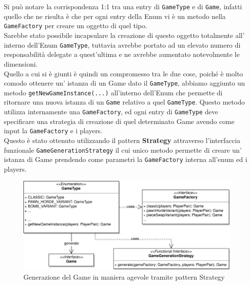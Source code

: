 \documentclass[a4paper,12pt]{report}
\begin{document}
\paragraph{}
\
\\
Si può notare la corrispondenza 1:1 tra una entry di \texttt{GameType} e di \texttt{Game}, infatti quello che ne risulta è che per ogni entry della Enum vi è un metodo nella \texttt{GameFactory} per creare un oggetto di quel tipo.
\\
Sarebbe stato possibile incapsulare la creazione di questo oggetto totalmente all' interno dell'Enum \texttt{GameType}, tuttavia avrebbe portato ad un elevato numero di responsabilità delegate a quest'ultima e ne avrebbe aumentato notevolmente le dimensioni.
\\
Quello a cui si è giunti è quindi un compromesso tra le due cose, poiché è molto comodo ottenere un' istanza di un Game dato il \texttt{GameType}, abbiamo aggiunto un metodo \texttt{getNewGameInstance(...)} all'interno dell'Enum che permette di ritornare una nuova istanza di un \texttt{Game} relativo a quel \texttt{GameType}. Questo metodo utilizza internamente una \texttt{GameFactory}, ed ogni entry di \texttt{GameType} deve specificare una strategia di creazione di quel determinato Game avendo come input la \texttt{GameFactory} e i players.
\\
Questo è stato ottenuto utilizzando il pattern \textbf{Strategy} attraverso l'interfaccia funzionale \texttt{GameGenerationStrategy} il cui unico metodo permette di creare un' istanza di Game prendendo come parametri la \texttt{GameFactory} interna all'enum ed i players.
%
\begin{figure}[H]
    \begin{center}
        \centering
        \includegraphics[width=\textwidth]{img/Alessandro/game_generation.png}
    \end{center}
    \caption{Generazione del Game in maniera agevole tramite pattern Strategy}
    \label{img:game_generation}
\end{figure}
%
\end{document}
